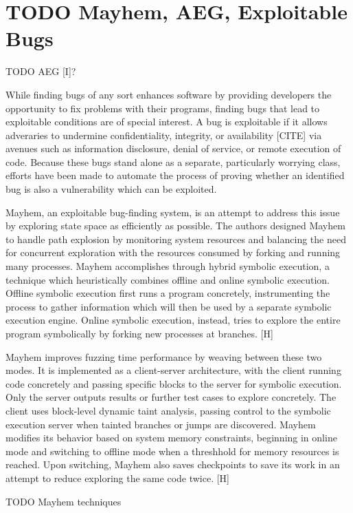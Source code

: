 \documentclass[11pt,expanded,copyright]{fsuthesis}
\begin{document}
\section{TODO Mayhem, AEG, Exploitable Bugs}

TODO AEG [I]?

While finding bugs of any sort enhances software by providing developers the opportunity to fix problems with their programs, finding bugs that lead to exploitable conditions are of special interest. A bug is exploitable if it allows adveraries to undermine confidentiality, integrity, or availability [CITE] via avenues such as information disclosure, denial of service, or remote execution of code. Because these bugs stand alone as a separate, particularly worrying class, efforts have been made to automate the process of proving whether an identified bug is also a vulnerability which can be exploited.

Mayhem, an exploitable bug-finding system, is an attempt to address this issue by exploring state space as efficiently as possible. The authors designed Mayhem to handle path explosion by monitoring system resources and balancing the need for concurrent exploration with the resources consumed by forking and running many processes. Mayhem accomplishes through hybrid symbolic execution, a technique which heuristically combines offline and online symbolic execution. Offline symbolic execution first runs a program concretely, instrumenting the process to gather information which will then be used by a separate symbolic execution engine. Online symbolic execution, instead, tries to explore the entire program symbolically by forking new processes at branches. [H]

Mayhem improves fuzzing time performance by weaving between these two modes. It is implemented as a client-server architecture, with the client running code concretely and passing specific blocks to the server for symbolic execution. Only the server outputs results or further test cases to explore concretely. The client uses block-level dynamic taint analysis, passing control to the symbolic execution server when tainted branches or jumps are discovered. Mayhem modifies its behavior based on system memory constraints, beginning in online mode and switching to offline mode when a threshhold for memory resources is reached. Upon switching, Mayhem also saves checkpoints to save its work in an attempt to reduce exploring the same code twice. [H]

TODO Mayhem techniques
\end{document}
